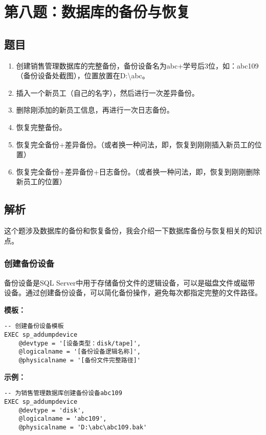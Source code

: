 \section{第八题：数据库的备份与恢复}

\subsection{题目}

\begin{enumerate}
  \item 创建销售管理数据库的完整备份，备份设备名为abc+学号后3位，如：abc109（备份设备处截图），位置放置在D:\textbackslash abc。
  \item 插入一个新员工（自己的名字），然后进行一次差异备份。
  \item 删除刚添加的新员工信息，再进行一次日志备份。
  \item 恢复完整备份。
  \item 恢复完全备份+差异备份。（或者换一种问法，即，恢复到刚刚插入新员工的位置）
  \item 恢复完全备份+差异备份+日志备份。（或者换一种问法，即，恢复到刚刚删除新员工的位置）
\end{enumerate}

\subsection{解析}
\qquad 这个题涉及数据库的备份和恢复备份，我会介绍一下数据库备份与恢复相关的知识点。

\subsubsection{创建备份设备}

\qquad 备份设备是SQL Server中用于存储备份文件的逻辑设备，可以是磁盘文件或磁带设备。通过创建备份设备，可以简化备份操作，避免每次都指定完整的文件路径。

\qquad \textbf{模板：}
\begin{mdframed}[backgroundcolor=gray!10]
\begin{verbatim}
-- 创建备份设备模板
EXEC sp_addumpdevice
    @devtype = '[设备类型：disk/tape]',
    @logicalname = '[备份设备逻辑名称]',
    @physicalname = '[备份文件完整路径]'
\end{verbatim}
\end{mdframed}

\qquad \textbf{示例：}
\begin{mdframed}[backgroundcolor=blue!5]
\begin{verbatim}
-- 为销售管理数据库创建备份设备abc109
EXEC sp_addumpdevice
    @devtype = 'disk',
    @logicalname = 'abc109',
    @physicalname = 'D:\abc\abc109.bak'
\end{verbatim}
\end{mdframed}


